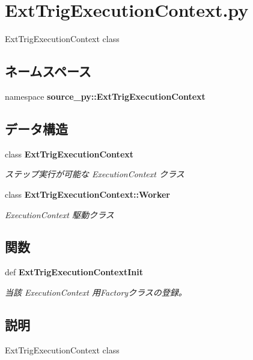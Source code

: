 \section{ExtTrigExecutionContext.py}
\label{_ext_trig_execution_context_8py}
ExtTrigExecutionContext class 

\subsection*{ネームスペース}
\begin{CompactItemize}
\item 
namespace \textbf{source\_\-py::ExtTrigExecutionContext}
\end{CompactItemize}
\subsection*{データ構造}
\begin{CompactItemize}
\item 
class {\bf ExtTrigExecutionContext}
\begin{CompactList}\small\item\em ステップ実行が可能な ExecutionContext クラス \item\end{CompactList}\item 
class {\bf ExtTrigExecutionContext::Worker}
\begin{CompactList}\small\item\em ExecutionContext 駆動クラス \item\end{CompactList}\end{CompactItemize}
\subsection*{関数}
\begin{CompactItemize}
\item 
def {\bf ExtTrigExecutionContextInit}
\begin{CompactList}\small\item\em 当該 ExecutionContext 用Factoryクラスの登録。 \item\end{CompactList}\end{CompactItemize}


\subsection{説明}
ExtTrigExecutionContext class 

